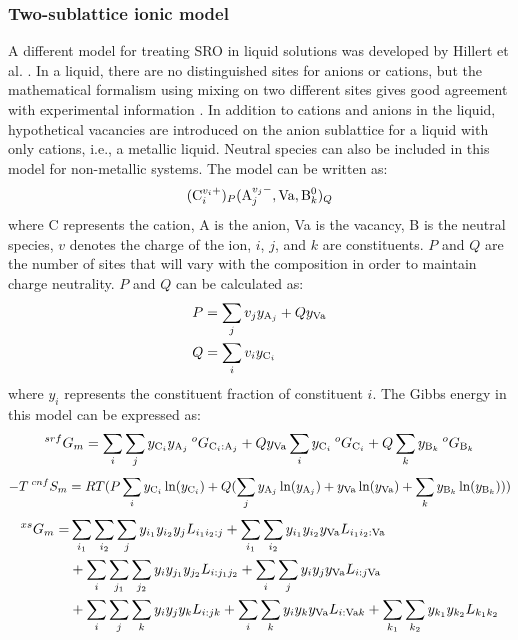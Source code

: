\subsubsection{Two-sublattice ionic model} \label{method:sssec:ionic}
A different model for treating SRO in liquid solutions was developed
by Hillert et al. \cite{hillert1985two}. In a liquid, there are no distinguished sites for anions or cations, but the mathematical formalism using mixing on two different sites gives good agreement with experimental information \cite{lukas2007computational}. In addition to cations and anions in the liquid, hypothetical vacancies are introduced on the anion sublattice for a liquid with only cations, i.e., a metallic liquid. Neutral species can also be included in this model for non-metallic systems. The model can be written as:
\begin{equation} \label{method:eq:ionicM}
    ({\rm C}_i^{v_i+})_P({\rm A}_j^{v_j-}, {\rm Va}, {\rm B}_k^0)_Q
\end{equation}
where C represents the cation, A is the anion, Va is the vacancy, B is the neutral species, $v$ denotes the charge of the ion, $i$, $j$, and $k$ are constituents. $P$ and $Q$ are the number of sites that will vary with the composition in order to maintain charge neutrality. $P$ and $Q$ can be calculated as:
\begin{equation} \label{method:eq:ionicPQ}
    \begin{aligned}
        & P=\sum_jv_jy_{{\rm A}_j}+Qy_{\rm Va}\\
        & Q=\sum_iv_iy_{{\rm C}_i}
    \end{aligned}
\end{equation}
where $y_i$ represents the constituent fraction of constituent $i$. The Gibbs energy in this model can be expressed as:
\begin{equation} \label{method:eq:ionicGsrf}
    ^{srf}G_m=\sum_i\sum_jy_{{\rm C}_i}y_{{\rm A}_j}\:^{o}G_{{\rm C}_i:{\rm A}_j}+Qy_{\rm Va}\sum_iy_{{\rm C}_i}\:^{o}G_{{\rm C}_i}+Q\sum_ky_{{\rm B}_k}\:^{o}G_{{\rm B}_k}
\end{equation}
\begin{equation} \label{method:eq:ionicScnf}
    -T\:^{cnf}S_m=RT(P\sum_iy_{{\rm C}_i}\ln (y_{{\rm C}_i})+Q(\sum_jy_{{\rm A}_j}\ln (y_{{\rm A}_j})+y_{\rm Va}\ln (y_{\rm Va})+\sum_ky_{{\rm B}_k}\ln (y_{{\rm B}_k})))
\end{equation}
\begin{equation} \label{method:eq:ionicGxs}
    \begin{aligned}
        ^{xs}G_m=&\sum_{i_1}\sum_{i_2}\sum_jy_{i_1}y_{i_2}y_{j}L_{i_1i_2:j}+\sum_{i_1}\sum_{i_2}y_{i_1}y_{i_2}y_{\rm Va}L_{i_1i_2:{\rm Va}}\\&+\sum_{i}\sum_{j_1}\sum_{j_2}y_{i}y_{j_1}y_{j_2}L_{i:j_1j_2}+\sum_{i}\sum_{j}y_iy_jy_{\rm Va}L_{i:j{\rm Va}}\\&+\sum_{i}\sum_{j}\sum_{k}y_{i}y_{j}y_{k}L_{i:jk}+\sum_{i}\sum_{k}y_{i}y_{k}y_{\rm Va}L_{i:{\rm Va}k}+\sum_{k_1}\sum_{k_2}y_{k_1}y_{k_2}L_{k_1k_2}
    \end{aligned}
\end{equation}

